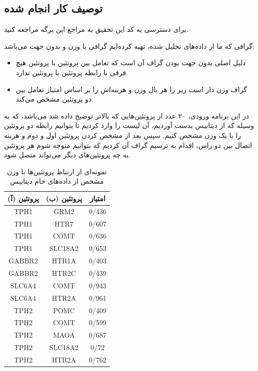 \documentclass[10pt, a4paper]{article}
\begin{document}
\subsection{توصیف کار انجام شده}

برای دسترسی به کد \cite{asn_Soltani_Neshan_Serotonin_Pathways_Interaction} این
تحقیق به مراجع این برگه مراجعه کنید.

گرافی که ما از داده‌های تحلیل شده، تهیه کرده‌ایم گرافی با وزن و بدون جهت
می‌باشد:

\begin{itemize}
    \item دلیل اصلی بدون جهت بودن گراف آن است که تعامل بین پروتئین  با
    پروتئین  هیچ فرقی با رابطه پروتئین  با پروتئین  ندارد.
    \item گراف وزن دار است زیر را هر یال وزن و هزینه‌اش را بر اساس امتیاز تعامل
    بین دو پروتئین مشخص می‌کند.
\end{itemize}

در این برنامه‌ ورودی، ۲۰ عدد از پروتئین‌هایی که بالاتر توضیح داده شد می‌باشد، که
به وسیله  که از دیتابیس  بدست آوردیم، آن لیست را وارد کردیم
تا بتوانیم رابطه دو پروتئین را با یک وزن مشخص کنیم. سپس بعد از مشخص کردن پروتئین
اول و دوم و هزینه اتصال بین دو راس، اقدام به ترسیم گراف آن کردیم که بتوانیم
متوجه شوم هر پروتئین به چه پروتئین‌های دیگر می‌تواند متصل شود.

\begin{LTR}
    \begin{table}[H]
        \centering
        \begin{RTL}
            \caption{نمونه‌ای از ارتباط پروتئین‌ها با وزن مشخص از داده‌های خام
            دیتابیس }
        \end{RTL}
        \begin{tabular}{cc|c}
            پروتئین (آ) & پروتئین (ب) & امتیاز \\ \hline
            TPH1 & GRM2 & 0/436 \\ \hline  
            TPH1 & HTR7 & 0/607 \\ \hline
            TPH1 & COMT & 0/636 \\ \hline
            TPH1 & SLC18A2 & 0/653 \\ \hline
            GABBR2 & HTR1A & 0/403 \\ \hline
            GABBR2 & HTR2C & 0/439 \\ \hline
            SLC6A4 & COMT & 0/943 \\ \hline
            SLC6A4 & HTR2A & 0/961 \\ \hline
            TPH2 & POMC & 0/409 \\ \hline
            TPH2 & COMT & 0/599 \\ \hline
            TPH2 & MAOA & 0/687 \\ \hline
            TPH2 & SLC18A2 & 0/72 \\ \hline
            TPH2 & HTR2A & 0/762 \\ 
        \end{tabular}
    \end{table}
\end{LTR}
\end{document}
